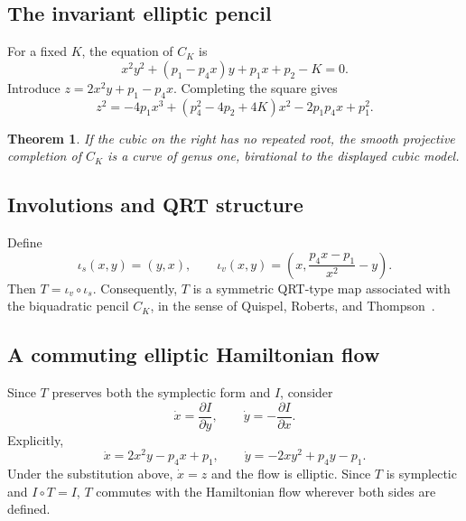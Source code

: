\documentclass[11pt]{article}
\newtheorem{theorem}{Theorem}
\theoremstyle{remark}
\begin{document}
\subsection{The invariant elliptic pencil}
For a fixed $K$, the equation of $C_K$ is
\begin{equation}
x^2y^2+(p_1-p_4x)y+p_1x+p_2-K=0.
\end{equation}
Introduce $z=2x^2y+p_1-p_4x$. Completing the square gives
\begin{equation}
z^2=-4p_1x^3+(p_4^2-4p_2+4K)x^2-2p_1p_4x+p_1^2.
\end{equation}
\begin{theorem}
If the cubic on the right has no repeated root, the smooth projective completion of $C_K$ is a curve of genus one, birational to the displayed cubic model.
\end{theorem}

\subsection{Involutions and QRT structure}
Define
\[
\iota_s(x,y)=(y,x),\qquad
\iota_v(x,y)=\left(x,\frac{p_4x-p_1}{x^2}-y\right).
\]
Then $T=\iota_v\circ\iota_s$. Consequently, $T$ is a symmetric QRT-type map associated with the biquadratic pencil $C_K$, in the sense of Quispel, Roberts, and Thompson~\cite{QRT1988}.

\subsection{A commuting elliptic Hamiltonian flow}
Since $T$ preserves both the symplectic form and $I$, consider
\begin{equation}
\dot x=\frac{\partial I}{\partial y},\qquad \dot y=-\frac{\partial I}{\partial x}.
\end{equation}
Explicitly,
\begin{equation}
\dot x=2x^2y-p_4x+p_1,\qquad \dot y=-2xy^2+p_4y-p_1.
\end{equation}
Under the substitution above, $\dot x=z$ and the flow is elliptic. Since $T$ is symplectic and $I\circ T=I$, $T$ commutes with the Hamiltonian flow wherever both sides are defined.
\end{document}
